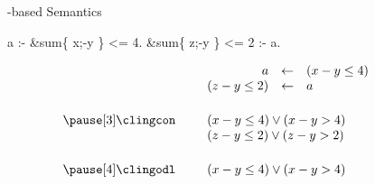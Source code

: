 \begin{frame}[fragile]{\HTC-based Semantics}
  \smallskip
  \begin{semiverbatim}
                           a :- &sum\{ x;-y \} <= 4.
            &sum\{ z;-y \} <= 2 :- a.
  \end{semiverbatim}
  \bigskip\pause
  \[
    \begin{array}{rp{5pt}rclp{20pt}}
                     && a            &\leftarrow&  (x-y\leq 4)         &\\
                     && (z-y\leq 2)  &\leftarrow&  a                   &\\[15pt]\pause[3]
    \text{\clingcon} && \multicolumn{3}{l}{(x-y\leq 4) \vee (x-y > 4)} &\\
                     && \multicolumn{3}{l}{(z-y\leq 2) \vee (z-y>2)}   &\\[15pt]\pause[4]
    \text{\clingodl} && \multicolumn{3}{l}{(x-y\leq 4) \vee (x-y > 4)} &
    \end{array}
  \]
\end{frame}
%
